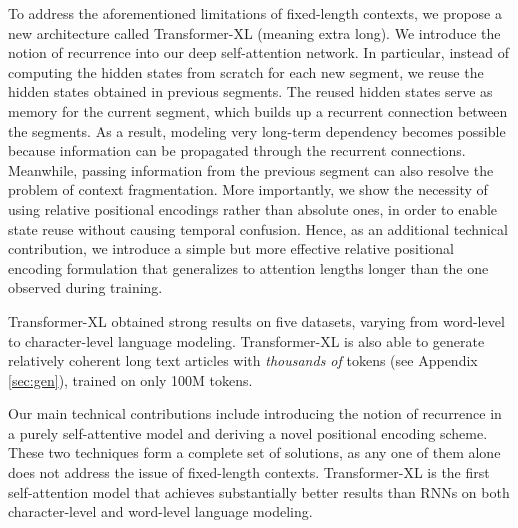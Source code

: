 
To address the aforementioned limitations of fixed-length contexts, we propose a new architecture called Transformer-XL (meaning extra long).
We introduce the notion of recurrence into our deep self-attention network. In particular, instead of computing the hidden states from scratch for each new segment, we reuse the hidden states obtained in previous segments.
The reused hidden states serve as memory for the current segment, which builds up a recurrent connection between the segments.
As a result, modeling very long-term dependency becomes possible because information can be propagated through the recurrent connections.
Meanwhile, passing information from the previous segment can also resolve the problem of context fragmentation.
More importantly, we show the necessity of using relative positional encodings rather than absolute ones, in order to enable state reuse without causing temporal confusion.
Hence, as an additional technical contribution, we introduce a simple but more effective relative positional encoding formulation that generalizes to attention lengths longer than the one observed during training.

Transformer-XL obtained strong results on five datasets, varying from word-level to character-level language modeling.
Transformer-XL is also able to generate relatively coherent long text articles with \textit{thousands of} tokens (see Appendix \ref{sec:gen}), trained on only 100M tokens.

Our main technical contributions include introducing the notion of recurrence in a purely self-attentive model and deriving a novel positional encoding scheme. These two techniques form a complete set of solutions, as any one of them alone does not address the issue of fixed-length contexts. Transformer-XL is the first self-attention model that achieves substantially better results than RNNs on both character-level and word-level language modeling.


